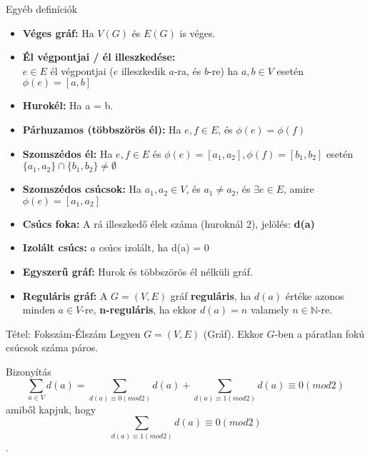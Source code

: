 \documentclass{beamer}
\begin{document}
\begin{frame}

\begin{block}{Egyéb definíciók}
\begin{itemize}
\item \textbf{Véges gráf:} Ha $V(G)$ és $E(G)$ is véges.
\item \textbf{Él végpontjai / él illeszkedése:}\\
$e \in E$ él végpontjai ($e$ illeszkedik $a$-ra, és $b$-re) ha $a, b \in V$ esetén ${\phi}(e) = [a, b]$
\item \textbf{Hurokél:} Ha a = b.
\item \textbf{Párhuzamos (többszörös él):} Ha $e, f \in E$, és ${\phi}(e) = {\phi}(f)$
\item \textbf{Szomszédos él:} Ha $e, f \in E$ és ${\phi}(e) = [a_1, a_2], {\phi}(f) = [b_1, b_2]$ esetén $\{a_1, a_2\} \cap \{b_1, b_2\} \neq \emptyset$
\item \textbf{Szomszédos csúcsok:} Ha $a_1, a_2 \in V$, és $a_1 \neq a_2$, és ${\exists}e \in E$, amire ${\phi}(e) = [a_1, a_2]$
\item \textbf{Csúcs foka:} A rá illeszkedő élek száma (huroknál 2), jelölés: \textbf{d(a)}
\item \textbf{Izolált csúcs:} $a$ csúcs izolált, ha d(a) = 0
\item \textbf{Egyszerű gráf:} Hurok és többszörös él nélküli gráf.
\item \textbf{Reguláris gráf:} A $G = (V, E)$ gráf \textbf{reguláris}, ha $d(a)$ értéke azonos minden $a \in V$-re, \textbf{n-reguláris}, ha ekkor $d(a) = n$ valamely $n \in \mathbb{N}$-re.
\end{itemize}
\end{block}

\end{frame}

\begin{frame}

\begin{block}{Tétel: Fokszám-Élszám}
Legyen $G = (V, E)$ (Gráf). Ekkor $G$-ben a páratlan fokú csúcsok száma páros.

\end{block}

\begin{block}{Bizonyítás}
$$\sum_{a \in V} d(a) = \sum_{d(a) \equiv 0 (mod 2)} d(a) + \sum_{d(a) \equiv 1 (mod 2)} d(a) \equiv 0 (mod 2)$$
amiből kapjuk, hogy $$\sum_{d(a) \equiv 1 (mod 2)} d(a) \equiv 0 (mod 2)$$.

\end{block}

\end{frame}
\end{document}
